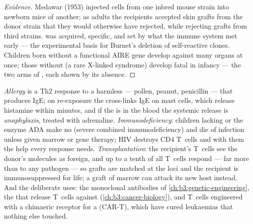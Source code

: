 \begin{proof}[Evidence]
Medawar (1953) injected cells from one inbred mouse strain into
newborn mice of another; as adults the recipients accepted skin grafts
from the donor strain that they would otherwise have rejected, while
rejecting grafts from third strains.  was acquired, specific,
and set by what the immune system met early --- the experimental basis
for Burnet's deletion of self-reactive clones. Children born without a
functional AIRE gene develop  against many organs at once;
those without  (a rare X-linked syndrome) develop fatal
 in infancy --- the two arms of , each shown by
its absence.
\end{proof}

\begin{example}\label{ex:b3:adaptive-immunity:failures}
\emph{Allergy} is a Th2 response to a harmless  --- pollen,
peanut, penicillin --- that produces IgE; on re-exposure the 
cross-links IgE on mast cells, which release histamine within minutes,
and if the  is in the blood the systemic release is
\emph{anaphylaxis}, treated with adrenaline. \emph{Immunodeficiency}:
children lacking  or the enzyme ADA make no  (severe
combined immunodeficiency) and die of infection unless given marrow
or gene therapy; HIV destroys CD4 T~cells and with them the help every
response needs. \emph{Transplantation}: the recipient's T~cells see the
donor's  molecules as foreign, and up to a tenth of all T~cells
respond --- far more than to any pathogen --- so grafts are matched at
the  loci and the recipient is immunosuppressed for life; a graft of
marrow can attack its new host instead. And the deliberate uses: the
monoclonal antibodies of \cref{ch:b3:genetic-engineering}, the
 that release T~cells against 
(\cref{ch:b3:cancer-biology}), and T~cells engineered with a chimaeric
receptor for a   (CAR-T), which have cured leukaemias
that nothing else touched.
\end{example}

